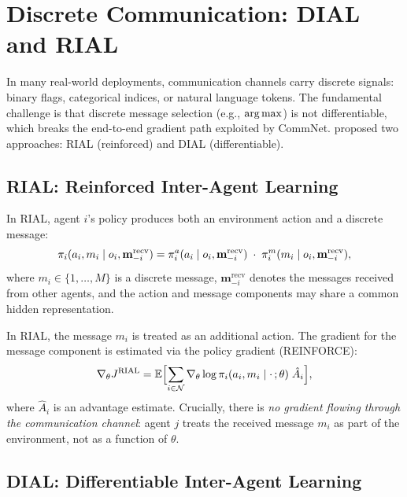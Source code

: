 \documentclass[11pt,a4paper]{article}
\begin{document}
\section{Discrete Communication: DIAL and RIAL}
\label{sec:dial-rial}

In many real-world deployments, communication channels carry
discrete signals: binary flags, categorical indices, or natural
language tokens.  The fundamental challenge is that discrete
message selection (e.g., $\operatorname{arg\,max}$) is not differentiable, which
breaks the end-to-end gradient path exploited by CommNet.
\citet{foerster2016} proposed two approaches: RIAL (reinforced)
and DIAL (differentiable).

\subsection{RIAL: Reinforced Inter-Agent Learning}

\begin{definition}
\label{def:rial}
In RIAL, agent $i$'s policy produces both an environment action
and a discrete message:
\[
  \pi_i(a_i, m_i \mid o_i, \mathbf{m}_{-i}^{\mathrm{recv}})
  = \pi_i^a(a_i \mid o_i, \mathbf{m}_{-i}^{\mathrm{recv}})
  \;\cdot\; \pi_i^m(m_i \mid o_i,
  \mathbf{m}_{-i}^{\mathrm{recv}}),
\]
where $m_i \in \{1, \ldots, M\}$ is a discrete message,
$\mathbf{m}_{-i}^{\mathrm{recv}}$ denotes the messages received
from other agents, and the action and message components may share
a common hidden representation.
\end{definition}

In RIAL, the message $m_i$ is treated as an additional action.
The gradient for the message component is estimated via the
policy gradient (REINFORCE):
\begin{equation}
  \nabla_\theta J^{\mathrm{RIAL}} = \mathbb{E}\Bigl[
    \sum_{i \in \mathcal{N}} \nabla_\theta \log \pi_i(a_i,
    m_i \mid \cdot\,; \theta) \; \hat{A}_i \Bigr],
  \label{eq:rial-gradient}
\end{equation}
where $\hat{A}_i$ is an advantage estimate.  Crucially, there is
\emph{no gradient flowing through the communication channel}:
agent $j$ treats the received message $m_i$ as part of the
environment, not as a function of $\theta$.

\subsection{DIAL: Differentiable Inter-Agent Learning}
\end{document}
